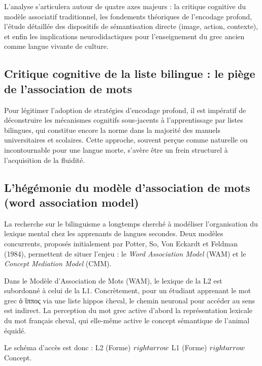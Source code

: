 L'analyse s'articulera autour de quatre axes majeurs : la critique cognitive du modèle associatif
traditionnel, les fondements théoriques de l'encodage profond, l'étude détaillée des dispositifs de
sémantisation directe (image, action, contexte), et enfin les implications neurodidactiques pour
l'enseignement du grec ancien comme langue \og vivante\fg{} de culture.



\subsection{Critique cognitive de la liste bilingue : le piège de l'association de mots}

Pour légitimer l'adoption de stratégies d'encodage profond, il est impératif de déconstruire les
mécanismes cognitifs sous-jacents à l'apprentissage par listes bilingues, qui constitue encore la
norme dans la majorité des manuels universitaires et scolaires. Cette approche, souvent perçue comme
\og naturelle\fg{} ou \og incontournable\fg{} pour une langue morte, s'avère être un frein
structurel à l'acquisition de la fluidité.



\subsection{L'hégémonie du modèle d'association de mots (word association model)}

La recherche sur le bilinguisme a longtemps cherché à modéliser l'organisation du lexique mental
chez les apprenants de langues secondes. Deux modèles concurrents, proposés initialement par Potter,
So, Von Eckardt et Feldman (1984), permettent de situer l'enjeu : le \textit{Word Association Model}
(WAM) et le \textit{Concept Mediation Model} (CMM).\cite{III-1-3-ref1}

Dans le Modèle d'Association de Mots (WAM), le lexique de la L2 est subordonné à celui de la L1.
Concrètement, pour un étudiant apprenant le mot grec ὁ ἵππος via une liste \og hippos \=
cheval\fg{}, le chemin neuronal pour accéder au sens est indirect. La perception du mot grec active
d'abord la représentation lexicale du mot français \og cheval\fg{}, qui elle-même active le concept
sémantique de l'animal équidé.

Le schéma d'accès est donc : L2 (Forme) $\\rightarrow$ L1 (Forme) $\\rightarrow$ Concept.

